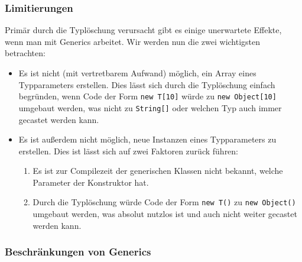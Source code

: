 	\subsubsection{Limitierungen}
		Primär durch die Typlöschung verursacht gibt es einige unerwartete Effekte, wenn man mit Generics arbeitet. Wir werden nun die zwei wichtigsten betrachten:
		\begin{itemize}
			\item Es ist nicht (mit vertretbarem Aufwand) möglich, ein Array eines Typparameters erstellen. Dies lässt sich durch die Typlöschung einfach begründen, wenn Code der Form \texttt{new T[10]} würde zu \texttt{new Object[10]} umgebaut werden, was nicht zu \texttt{String[]} oder welchen Typ auch immer gecastet werden kann.
			\item Es ist außerdem nicht möglich, neue Instanzen eines Typparameters zu erstellen. Dies ist lässt sich auf zwei Faktoren zurück führen:
				\begin{enumerate}
					\item Es ist zur Compilezeit der generischen Klassen nicht bekannt, welche Parameter der Konstruktor hat.
					\item Durch die Typlöschung würde Code der Form \texttt{new T()} zu \texttt{new Object()} umgebaut werden, was absolut nutzlos ist und auch nicht weiter gecastet werden kann.
				\end{enumerate}
		\end{itemize}

	\subsubsection{Beschränkungen von Generics}
		
